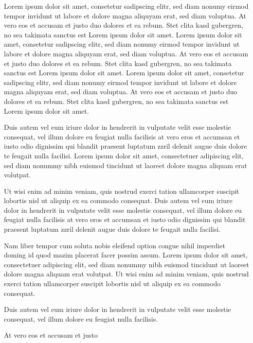 \documentclass[]{../metanetpaper}
\begin{document}
\begin{Parallel}[c]{80mm}{80mm}
{    Lorem ipsum dolor sit amet, consetetur sadipscing elitr, sed diam nonumy eirmod tempor invidunt ut labore et dolore magna aliquyam erat, sed diam voluptua. At vero eos et accusam et justo duo dolores et ea rebum. Stet clita kasd gubergren, no sea takimata sanctus est Lorem ipsum dolor sit amet. Lorem ipsum dolor sit amet, consetetur sadipscing elitr, sed diam nonumy eirmod tempor invidunt ut labore et dolore magna aliquyam erat, sed diam voluptua. At vero eos et accusam et justo duo dolores et ea rebum. Stet clita kasd gubergren, no sea takimata sanctus est Lorem ipsum dolor sit amet. Lorem ipsum dolor sit amet, consetetur sadipscing elitr, sed diam nonumy eirmod tempor invidunt ut labore et dolore magna aliquyam erat, sed diam voluptua. At vero eos et accusam et justo duo dolores et ea rebum. Stet clita kasd gubergren, no sea takimata sanctus est Lorem ipsum dolor sit amet.   

    Duis autem vel eum iriure dolor in hendrerit in vulputate velit esse molestie consequat, vel illum dolore eu feugiat nulla facilisis at vero eros et accumsan et iusto odio dignissim qui blandit praesent luptatum zzril delenit augue duis dolore te feugait nulla facilisi. Lorem ipsum dolor sit amet, consectetuer adipiscing elit, sed diam nonummy nibh euismod tincidunt ut laoreet dolore magna aliquam erat volutpat.   

    Ut wisi enim ad minim veniam, quis nostrud exerci tation ullamcorper suscipit lobortis nisl ut aliquip ex ea commodo consequat. Duis autem vel eum iriure dolor in hendrerit in vulputate velit esse molestie consequat, vel illum dolore eu feugiat nulla facilisis at vero eros et accumsan et iusto odio dignissim qui blandit praesent luptatum zzril delenit augue duis dolore te feugait nulla facilisi.   

    Nam liber tempor cum soluta nobis eleifend option congue nihil imperdiet doming id quod mazim placerat facer possim assum. Lorem ipsum dolor sit amet, consectetuer adipiscing elit, sed diam nonummy nibh euismod tincidunt ut laoreet dolore magna aliquam erat volutpat. Ut wisi enim ad minim veniam, quis nostrud exerci tation ullamcorper suscipit lobortis nisl ut aliquip ex ea commodo consequat.   

    Duis autem vel eum iriure dolor in hendrerit in vulputate velit esse molestie consequat, vel illum dolore eu feugiat nulla facilisis.   

    At vero eos et accusam et justo
  }

\end{Parallel}
\end{document}
